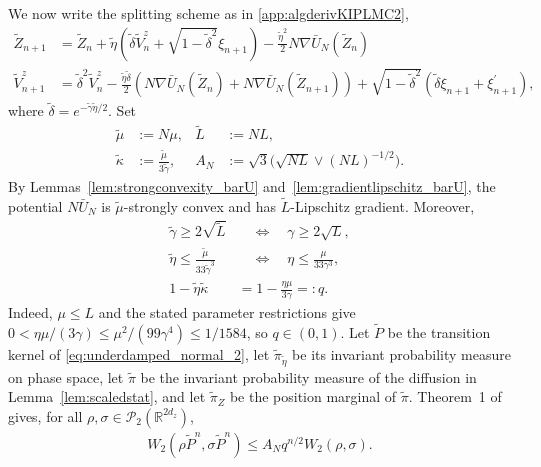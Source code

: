 We now write the splitting scheme as in \ref{app:algderivKIPLMC2},
\small
\begin{equation}
\begin{aligned}\label{eq:underdamped_normal_2}
\widetilde{Z}_{n+1} &= \widetilde{Z}_n + \tilde{\eta} (\tilde{\delta} \widetilde{V}^z_n + \sqrt{1-\tilde{\delta}^2} \xi_{n+1})- \frac{\tilde{\eta}^2}{2}N \nabla \bar{U}_N(\widetilde{Z}_n)\\
\widetilde{V}^z_{n+1} &= \tilde{\delta}^2 \widetilde{V}_n^z - \frac{\tilde{\eta}\tilde{\delta}}{2}(N\nabla \bar{U}_N(\widetilde{Z}_n) + N \nabla\bar{U}_N (\widetilde{Z}_{n+1}) ) + \sqrt{1-\tilde{\delta}^2}(\tilde{\delta}\xi_{n+1} + \xi_{n+1}^\prime),
\end{aligned}
\end{equation}
\normalsize
where $\tilde{\delta}=e^{-\tilde{\gamma}\tilde{\eta}/2}$.  Set
\begin{align*}
\widetilde\mu&:=N\mu,
&\widetilde L&:=NL,\\
\widetilde\kappa&:=\frac{\widetilde\mu}{3\widetilde\gamma},
&A_N&:=\sqrt{3}\bigl(\sqrt{NL}\lor(NL)^{-1/2}\bigr).
\end{align*}
By Lemmas~\ref{lem:strongconvexity_barU} and~\ref{lem:gradientlipschitz_barU}, the potential $N\bar U_N$ is $\widetilde\mu$-strongly convex and has $\widetilde L$-Lipschitz gradient.  Moreover,
\begin{align*}
\widetilde\gamma\geq2\sqrt{\widetilde L}
&\quad\Longleftrightarrow\quad \gamma\geq2\sqrt L,\\
\widetilde\eta\leq\frac{\widetilde\mu}{33\widetilde\gamma^3}
&\quad\Longleftrightarrow\quad \eta\leq\frac{\mu}{33\gamma^3},\\
1-\widetilde\eta\widetilde\kappa
&=1-\frac{\eta\mu}{3\gamma}=:q.
\end{align*}
Indeed, $\mu\leq L$ and the stated parameter restrictions give
$0<\eta\mu/(3\gamma)\leq\mu^2/(99\gamma^4)\leq1/1584$, so $q\in(0,1)$.
Let $\widetilde P$ be the transition kernel of \eqref{eq:underdamped_normal_2}, let $\widetilde\pi_{\widetilde\eta}$ be its invariant probability measure on phase space, let $\widetilde\pi$ be the invariant probability measure of the diffusion in Lemma~\ref{lem:scaledstat}, and let $\widetilde\pi_Z$ be the position marginal of $\widetilde\pi$.  Theorem~1 of \citep{monmarche2021high} gives, for all $\rho,\sigma\in\mathcal P_2(\mathbb R^{2d_z})$,
\begin{align}
W_2(\rho\widetilde P^n,\sigma\widetilde P^n)
\leq A_Nq^{n/2}W_2(\rho,\sigma).
\label{eq:kiplmc2_phase_contraction}
\end{align}
